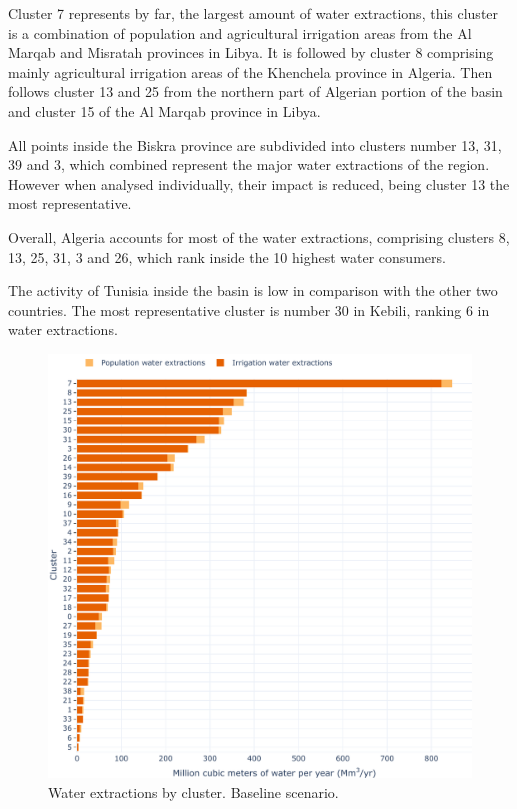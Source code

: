 \documentclass[12pt]{iopart}
\begin{document}
Cluster 7 represents by far, the largest amount of water extractions, this cluster is a combination of population and agricultural irrigation areas from the Al Marqab and Misratah provinces in Libya. It is followed by cluster 8 comprising mainly agricultural irrigation areas of the Khenchela province in Algeria. Then follows cluster 13 and 25 from the northern part of Algerian portion of the basin and cluster 15 of the Al Marqab province in Libya.

All points inside the Biskra province are subdivided into clusters number 13, 31, 39 and 3, which combined represent the major water extractions of the region. However when analysed individually, their impact is reduced, being cluster 13 the most representative.

Overall, Algeria accounts for most of the water extractions, comprising clusters 8, 13, 25, 31, 3 and 26, which rank inside the 10 highest water consumers. 

The activity of Tunisia inside the basin is low in comparison with the other two countries. The most representative cluster is number 30 in Kebili, ranking 6 in water extractions.

\newpage
\begin{figure}[!h]
	\centering
	\includegraphics[width=\textwidth]{BaselineWater2}
	\caption{Water extractions by cluster. Baseline scenario.}
	\label{fig:BaselineWater}
\end{figure}\newpage
\end{document}

